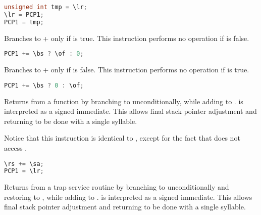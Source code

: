 \begin{lstlisting}[numbers=none, basicstyle=\ttfamily\footnotesize, language=C++]
unsigned int tmp = \lr;
\lr = PCP1;
PCP1 = tmp;
\end{lstlisting}

Branches to  + \code{\of} only if \code{\bs} is true. This 
instruction performs no operation if \code{\bs} is false.

\begin{lstlisting}[numbers=none, basicstyle=\ttfamily\footnotesize, language=C++]
PCP1 += \bs ? \of : 0;
\end{lstlisting}

Branches to  + \code{\of} only if \code{\bs} is false. This 
instruction performs no operation if \code{\bs} is true.

\begin{lstlisting}[numbers=none, basicstyle=\ttfamily\footnotesize, language=C++]
PCP1 += \bs ? 0 : \of;
\end{lstlisting}

Returns from a function by branching to \code{\lr} unconditionally, while adding 
\code{\sa} to \code{\rs}. \code{\sa} is interpreted as a signed immediate. This
allows final stack pointer adjustment and returning to be done with a single
syllable.

Notice that this instruction is identical to , except for the fact 
that  does not access \code{\rs}.

\begin{lstlisting}[numbers=none, basicstyle=\ttfamily\footnotesize, language=C++]
\rs += \sa;
PCP1 = \lr;
\end{lstlisting}

Returns from a trap service routine by branching to  unconditionally 
and restoring  to , while adding \code{\sa} to \code{\rs}. 
\code{\sa} is interpreted as a signed immediate. This allows final stack pointer 
adjustment and returning to be done with a single syllable.

